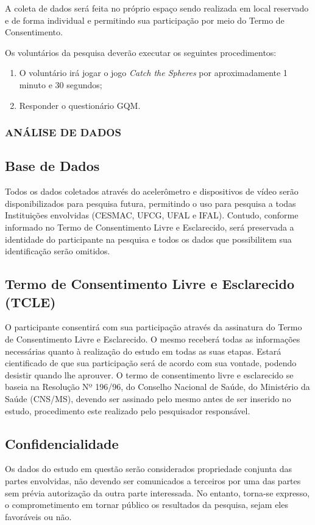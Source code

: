 A coleta de dados será feita no próprio espaço sendo realizada em local reservado e de forma individual e permitindo sua participação por meio do Termo de Consentimento.

Os voluntários da pesquisa deverão executar os seguintes procedimentos:
\begin{enumerate}
	\item O voluntário irá jogar o jogo \emph{Catch the Spheres} por aproximadamente 1 minuto e 30 segundos;
	\item Responder o questionário GQM.
\end{enumerate}

\subsubsection{ANÁLISE DE DADOS}


\subsection{Base de Dados}
Todos os dados coletados através do acelerômetro e dispositivos de vídeo serão disponibilizados para pesquisa futura, permitindo o uso para pesquisa a todas Instituições envolvidas (CESMAC, UFCG, UFAL e IFAL). Contudo, conforme informado no Termo de Consentimento Livre e Esclarecido, será preservada a identidade do participante na pesquisa e todos os dados que possibilitem sua identificação serão omitidos.


\subsection{Termo de Consentimento Livre e Esclarecido (TCLE)}
O participante consentirá com sua participação através da assinatura do Termo de Consentimento Livre e Esclarecido. O mesmo receberá todas as informações necessárias quanto à realização do estudo em todas as suas etapas. Estará cientificado de que sua participação será de acordo com sua vontade, podendo desistir quando lhe aprouver. O termo de consentimento livre e esclarecido se baseia na Resolução Nº 196/96, do Conselho Nacional de Saúde, do Ministério da Saúde (CNS/MS), devendo ser assinado pelo mesmo antes de ser inserido no estudo, procedimento este realizado pelo pesquisador responsável.

\subsection{Confidencialidade}
Os dados do estudo em questão serão considerados propriedade conjunta das partes envolvidas, não devendo ser comunicados a terceiros por uma das partes sem prévia autorização da outra parte interessada. No entanto, torna-se expresso, o comprometimento em tornar público os resultados da pesquisa, sejam eles favoráveis ou não.

